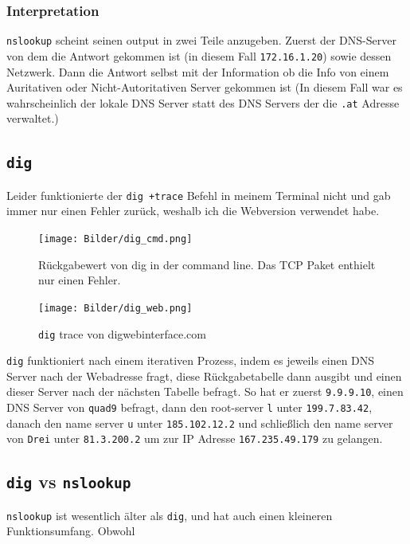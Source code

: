 \documentclass{article}
\begin{document}
	\subsubsection{Interpretation}
	\verb|nslookup| scheint seinen output in zwei Teile anzugeben. Zuerst der DNS-Server von dem die Antwort gekommen ist (in diesem Fall \verb|172.16.1.20|) sowie dessen Netzwerk. Dann die Antwort selbst mit der Information ob die Info von einem Auritativen oder Nicht-Autoritativen Server gekommen ist (In diesem Fall war es wahrscheinlich der lokale DNS Server statt des DNS Servers der die \verb|.at| Adresse verwaltet.) 
	\cprotect\subsection{\verb|dig|}
	Leider funktionierte der \verb|dig +trace| Befehl in meinem Terminal nicht und gab immer nur einen Fehler zurück, weshalb ich die Webversion verwendet habe.
	\begin{figure}[H]
	\centering
	\texttt{[image: Bilder/dig\_cmd.png]}
	\caption{Rückgabewert von dig in der command line. Das TCP Paket enthielt nur einen Fehler.}
	\end{figure}
	\begin{figure}[H]
	\centering
	\texttt{[image: Bilder/dig\_web.png]}
	\caption{\verb|dig| trace von digwebinterface.com }
	\end{figure}
	\verb|dig| funktioniert nach einem iterativen Prozess, indem es jeweils einen DNS Server nach der Webadresse fragt, diese Rückgabetabelle dann ausgibt und einen dieser Server nach der nächsten Tabelle befragt. So hat er zuerst \verb|9.9.9.10|, einen DNS Server von \verb|quad9|  befragt, dann den root-server \verb|l| unter \verb|199.7.83.42|, danach den name server \verb|u| unter \verb|185.102.12.2| und schließlich den name server von \verb|Drei| unter \verb|81.3.200.2| um zur IP Adresse \verb|167.235.49.179| zu gelangen.
	\cprotect\subsection{\verb|dig| vs \verb|nslookup|}     	
	\verb|nslookup| ist wesentlich älter als \verb|dig|, und hat auch einen kleineren Funktionsumfang. Obwohl  

	
	
	
	
\end{document}
